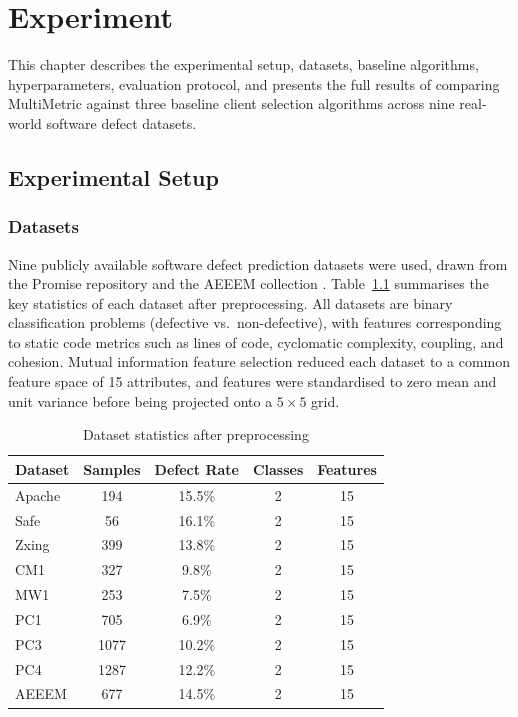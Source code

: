 \chapter{Experiment}

This chapter describes the experimental setup, datasets, baseline algorithms, hyperparameters, evaluation protocol, and presents the full results of comparing MultiMetric against three baseline client selection algorithms across nine real-world software defect datasets.

\section{Experimental Setup}

\subsection{Datasets}

Nine publicly available software defect prediction datasets were used, drawn from the Promise repository \citep{menzies2007promise} and the AEEEM collection \citep{d2010empirical}. Table~\ref{tab:datasets} summarises the key statistics of each dataset after preprocessing. All datasets are binary classification problems (defective vs.\ non-defective), with features corresponding to static code metrics such as lines of code, cyclomatic complexity, coupling, and cohesion. Mutual information feature selection reduced each dataset to a common feature space of 15 attributes, and features were standardised to zero mean and unit variance before being projected onto a $5 \times 5$ grid.

\begin{table}[htbp]
\centering
\caption{Dataset statistics after preprocessing}
\label{tab:datasets}
\begin{tabular}{|l|c|c|c|c|}
\hline
\textbf{Dataset} & \textbf{Samples} & \textbf{Defect Rate} & \textbf{Classes} & \textbf{Features} \\
\hline
Apache   & 194   & 15.5\% & 2 & 15 \\
Safe     & 56    & 16.1\% & 2 & 15 \\
Zxing    & 399   & 13.8\% & 2 & 15 \\
CM1      & 327   & 9.8\%  & 2 & 15 \\
MW1      & 253   & 7.5\%  & 2 & 15 \\
PC1      & 705   & 6.9\%  & 2 & 15 \\
PC3      & 1077  & 10.2\% & 2 & 15 \\
PC4      & 1287  & 12.2\% & 2 & 15 \\
AEEEM   & 677   & 14.5\% & 2 & 15 \\
\hline
\end{tabular}
\end{table}

